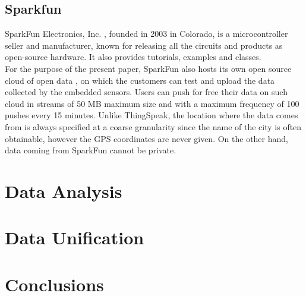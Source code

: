 \documentclass[a4paper,10pt]{article}
\begin{document}
\subsection*{Sparkfun}
SparkFun Electronics, Inc. \cite{sparkfun}, founded in 2003 in Colorado, is a microcontroller seller and manufacturer, known for releasing all the circuits and products as open-source hardware.
It also provides tutorials, examples and classes.
\\

For the purpose of the present paper, SparkFun also hosts its own open source cloud of open data \cite{sparkfundata}, on which the customers can test and upload the data collected by the embedded sensors.
Users can push for free their data on such cloud in streams of 50 MB maximum size and with a maximum frequency of 100 pushes every 15 minutes.
Unlike ThingSpeak, the location where the data comes from is always specified at a coarse granularity since the name of the city is often obtainable, however the GPS coordinates are never given.
On the other hand, data coming from SparkFun cannot be private.

\section{Data Analysis}


\section{Data Unification}

\section{Conclusions}







\end{document}
